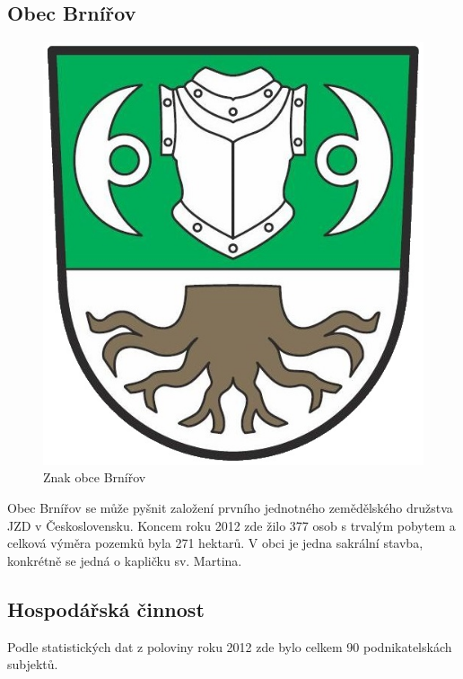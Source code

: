 \documentclass[12pt]{article} %
\begin{document}
\subsection{Obec Brnířov}
\begin{figure}
	\vspace{-20pt}
	\begin{center}
		\includegraphics[scale=0.8]{brnirov.jpg}
	\end{center}
	\vspace{-10pt}
	\caption{Znak obce Brnířov}
	\vspace{-20pt}
\end{figure}
Obec Brnířov se může pyšnit založení prvního jednotného zemědělského družstva JZD v Československu. Koncem roku 2012 zde žilo 377 osob s trvalým pobytem a celková výměra pozemků byla 271 hektarů. V obci je jedna sakrální stavba, konkrétně se jedná o kapličku sv. Martina.

\subsection{Hospodářská činnost}
Podle statistických dat z poloviny roku 2012 zde bylo celkem 90 podnikatelskách subjektů.
\end{document}
